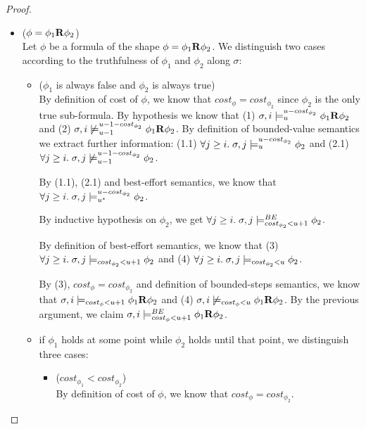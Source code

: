 \begin{theorem}
\begin{proof}
\begin{itemize}
    \item ($\phi = \phi_1 \mathbf{R} \phi_2$) \\
    Let $\phi$ be a formula of the shape $\phi = \phi_1 \mathbf{R} \phi_2$.
    We distinguish two cases according to the truthfulness of $\phi_1$ and $\phi_2$ along $\sigma$:
    \begin{itemize}
       \item ($\phi_1$ is always false and $\phi_2$ is always true) \\
        By definition of cost of $\phi$, we know that $cost_\phi = cost_{\phi_2}$ since $\phi_2$ is the only true sub-formula.
        By hypothesis we know that 
        (1) $\sigma, i \models_{u}^{u-cost_{\phi_2}} \phi_1 \mathbf{R} \phi_2$ and 
        (2) $\sigma, i \not\models_{u-1}^{u-1-cost_{\phi_2}} \phi_1 \mathbf{R} \phi_2$.
        By definition of bounded-value semantics we extract further information: 
        (1.1) $\forall j \geq i.\; \sigma,j \models_{u}^{u-cost_{\phi_2}} \phi_2$ and
        (2.1) $\forall j \geq i.\; \sigma,j \not\models_{u-1}^{u-1-cost_{\phi_2}} \phi_2$.
        
        By (1.1), (2.1) and best-effort semantics, we know that $\forall j \geq i.\; \sigma,j \models_{{u}^*}^{u-cost_{\phi_2}} \phi_2$.
        
        By inductive hypothesis on $\phi_2$, we get $\forall j \geq i.\; \sigma,j \models_{cost_{\phi_2} < u + 1}^{BE} \phi_2$.
        
        By definition of best-effort semantics, we know that (3) $\forall j \geq i.\; \sigma,j \models_{cost_{\phi_2} < u + 1} \phi_2$ and (4) $\forall j \geq i.\; \sigma,j \models_{cost_{\phi_2} < u} \phi_2$.
        
        By (3), $cost_\phi = cost_{\phi_2}$ and definition of bounded-steps semantics, we know that $\sigma,i \models_{cost_\phi < u + 1} \phi_1 \mathbf{R} \phi_2$ and (4) $\sigma,i \not\models_{cost_{\phi} < u} \phi_1 \mathbf{R} \phi_2$.
        By the previous argument, we claim $\sigma,i \models_{cost_\phi < u + 1}^{BE} \phi_1 \mathbf{R} \phi_2$.

        \item if $\phi_1$ holds at some point while $\phi_2$ holds until that point, we distinguish three cases:
        \begin{itemize}
            \item ($cost_{\phi_1} < cost_{\phi_2}$) \\
            By definition of cost of $\phi$, we know that $cost_\phi = cost_{\phi_2}$.
            

\end{itemize}
\end{itemize}
\end{itemize}
\end{proof}
\end{theorem}
